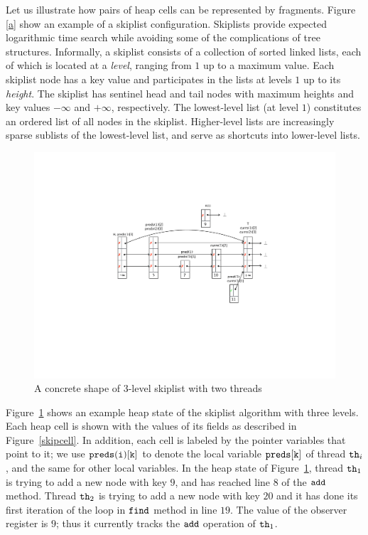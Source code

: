 Let us illustrate how pairs of heap cells can be represented by fragments. Figure \ref{a} show an example of a skiplist configuration. Skiplists provide expected logarithmic time search while avoiding some of the complications of tree structures.
Informally, a skiplist consists of a collection of sorted linked lists, each of which is located at a {\em level}, ranging from $1$ up to a maximum value. Each skiplist node has a key value and participates in the lists at levels $1$ up to its {\em height}.
The skiplist has sentinel head and tail nodes with maximum heights and key values $-\infty$ and $+\infty$, respectively.
The lowest-level list (at level $1$) constitutes an ordered list of all nodes
in the skiplist. Higher-level lists are increasingly sparse sublists of the
lowest-level list, and serve as shortcuts into lower-level lists.
\begin{figure}
\vspace*{-0.6cm}
\center  
 \includegraphics[width=1.2\textwidth, trim={7cm 8cm 0.5cm 6cm}, clip]{skipshape.pdf}  
\vspace*{-0.6cm}
 \caption{A concrete shape of 3-level skiplist with two threads}
\label{sl-shape}
\vspace*{-0.6cm}
\end{figure}
Figure~\ref{sl-shape} shows an example heap state of the
skiplist algorithm with three levels. Each heap cell is shown with the values of its fields as described in Figure~\ref{skipcell}. %
In addition, each cell is labeled by the
pointer variables that point to it; we use ${\tt preds(i)[k]}$ to denote the local
variable ${\tt preds[k]}$ of thread ${\tt th}_i$, and the same for other local variables.
In the heap state of Figure~\ref{sl-shape}, thread ${\tt th}_1$ is trying to add a new node with key $9$, and has reached line $8$ of the $\tt add$ method. Thread ${\tt th}_2$ is trying to add a new node with key $20$ and it has done its first iteration of the loop in $\tt find$ method in line $19$. The value of the observer register is $9$; thus it currently tracks the $\tt add$ operation of ${\tt th}_1$.

